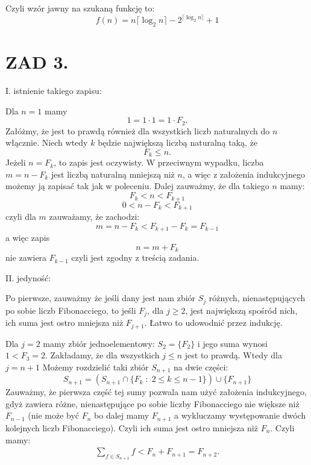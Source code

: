 \documentclass{article}[13pt]
\begin{document}
    Czyli wzór jawny na szukaną funkcję to:
    $$f(n)=n\lceil\log_2n\rceil-2^{\lceil\log_2n\rceil}+1$$

    \section*{ZAD 3.}

    I. istnienie takiego zapisu: 
    \medskip

    Dla $n=1$ mamy
    $$1=1\cdot 1=1\cdot F_2.$$
    Załóżmy, że jest to prawdą również dla wszystkich liczb naturalnych do $n$ włącznie. Niech wtedy $k$ będzie największą liczbą naturalną taką, że
    $$F_k\leq n.$$
    Jeżeli $n=F_k$, to zapis jest oczywisty. W przeciwnym wypadku, liczba $m=n-F_k$ jest liczbą naturalną mniejszą niż $n$, a więc z założenia indukcyjnego możemy ją zapisać tak jak w poleceniu. Dalej zauważmy, że dla takiego $n$ mamy:
    $$F_k< n<F_{k+1}$$
    $$0< n-F_k< F_{k+1}$$
    czyli dla $m$ zauważamy, że zachodzi:
    $$m=n-F_k<F_{k+1}-F_k=F_{k-1}$$
    a więc zapis
    $$n=m+F_k$$
    nie zawiera $F_{k-1}$ czyli jest zgodny z treścią zadania.
    \bigskip

    II. jedyność:
    \medskip

    Po pierwsze, zauważmy że jeśli dany jest nam zbiór $S_j$ różnych, nienastępujących po sobie liczb Fibonacciego, to jeśli $F_j$, dla $j\geq 2$, jest największą spośród nich, ich suma jest ostro mniejsza niż $F_{j+1}$. Łatwo to udowodnić przez indukcję.
    \smallskip
    
    Dla $j=2$ mamy zbiór jednoelementowy: $S_2=\{F_2\}$ i jego suma wynosi $1<F_3=2$. Zakładamy, że dla wszystkich $j\leq n$ jest to prawdą. Wtedy dla $j=n+1$ Możemy rozdzielić taki zbiór $S_{n+1}$ na dwie części:
    $$S_{n+1}=(S_{n+1}\cap\{F_k\;:\;2\leq k\leq n-1\})\cup\{F_{n+1}\}$$
    Zauważmy, że pierwsza część tej sumy pozwala nam użyć założenia indukcyjnego, gdyż zawiera różne, nienastępujące po sobie liczby Fibonacciego nie większe niż $F_{n-1}$ (nie może być $F_n$ bo dalej mamy $F_{n+1}$ a wykluczamy występowanie dwóch kolejnych liczb Fibonacciego). Czyli ich suma jest ostro mniejsza niż $F_{n}$. Czyli mamy:
    \begin{align*}
        \sum\limits_{f\in S_{n+1}}f<F_n+F_{n+1}=F_{n+2}.
    \end{align*}
\end{document}
